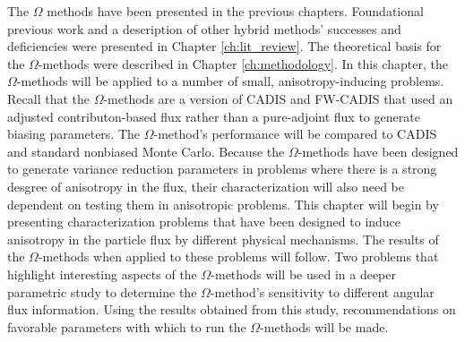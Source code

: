 The $\Omega$ methods have been presented in the previous chapters.
Foundational previous work and a description of other hybrid methods' successes
and deficiencies were presented in Chapter \ref{ch:lit_review}. The
theoretical basis for the $\Omega$-methods were described in Chapter
\ref{ch:methodology}. In this chapter, the $\Omega$-methods will be applied to a
number of small, anisotropy-inducing problems. Recall that the $\Omega$-methods
are a version of CADIS and FW-CADIS that used an adjusted contributon-based flux
rather than a pure-adjoint flux to generate biasing parameters.
The $\Omega$-method's performance
will be compared to CADIS and standard nonbiased Monte Carlo.
Because the $\Omega$-methods have been designed to generate variance reduction
parameters in problems
where there is a strong desgree of anisotropy in the flux, their
characterization will also need be dependent on testing them in anisotropic
problems.
This chapter will begin by presenting characterization problems
that have been designed to induce anisotropy in the particle flux by
different physical mechanisms. The results of the $\Omega$-methods when
applied to these problems will follow. Two problems that highlight interesting
aspects of the $\Omega$-methods will be used in a deeper parametric study to
determine the $\Omega$-method's sensitivity to different angular flux
information. Using the results obtained from this study,
recommendations on favorable
parameters with which to run the $\Omega$-methods will be made. \\

